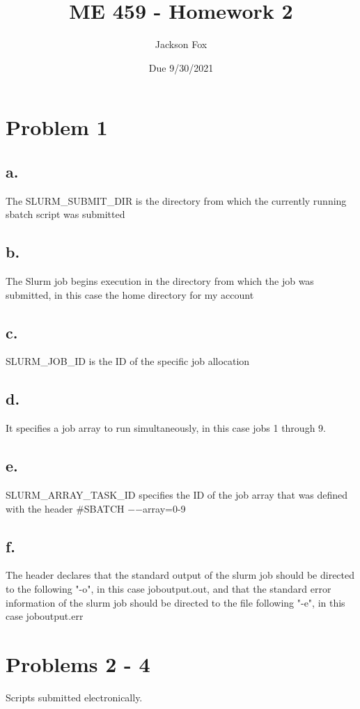 \documentclass[11pt, oneside]{article}   	%
\title{ME 459 - Homework 2}
\author{Jackson Fox}
\date{Due 9/30/2021}							%
\begin{document}
\maketitle
\section*{Problem 1}
	\subsection*{a.} The SLURM\_SUBMIT\_DIR is the directory from which the currently running sbatch script was submitted
	\subsection*{b.} The Slurm job begins execution in the directory from which the job was submitted, in this case the home directory for my account
	\subsection*{c.} SLURM\_JOB\_ID is the ID of the specific job allocation
	\subsection*{d.} It specifies a job array to run simultaneously, in this case jobs 1 through 9.
	\subsection*{e.} SLURM\_ARRAY\_TASK\_ID specifies the ID of the job array that was defined with the header \#SBATCH $-$$-$array=0-9
	\subsection*{f.} The header declares that the standard output of the slurm job should be directed to the following "-o", in this case joboutput.out, and that the standard error information of the slurm job should be directed to the file following "-e", in this case joboutput.err

\section*{Problems 2 - 4}
Scripts submitted electronically.
\end{document}
